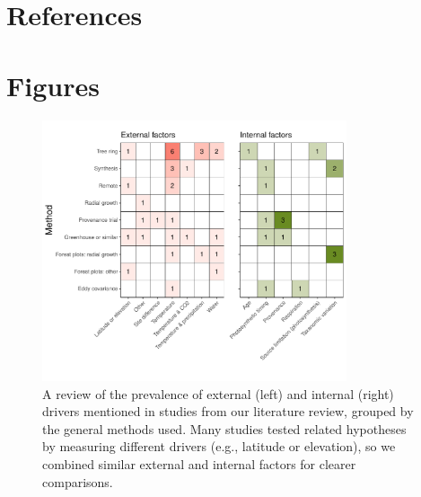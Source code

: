 \documentclass[11pt]{article}
\begin{document}


\clearpage
\section*{References}



\section*{Figures}


\clearpage
\begin{figure}[h!]
\includegraphics[width=0.8\textwidth]{..//figures/heatmaps/heatmap_combined_endo&exo.pdf}
\caption{A review of the prevalence of external (left) and internal (right) drivers mentioned in studies from our literature review, grouped by the general methods used. Many studies tested related hypotheses by measuring different drivers (e.g., latitude or elevation), so we combined similar external and internal factors for clearer comparisons.}
\label{fig:heatmapssupp}
\end{figure}
\end{document}

